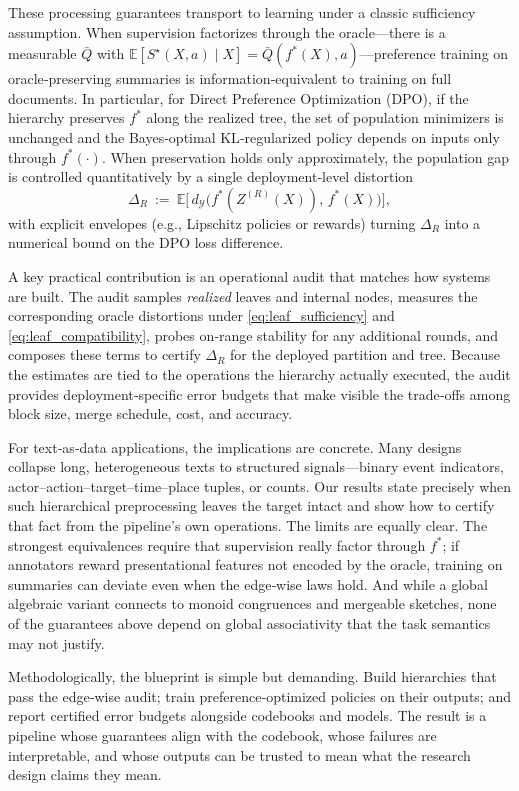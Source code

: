 \documentclass[11pt]{article}
\newcommand{\Y}{\mathcal{Y}}               %
\newcommand{\fstar}{f^*}               %
\newcommand{\E}{\mathbb{E}}
\newcommand{\metric}{d_{\Y}}
\begin{document}
These processing guarantees transport to learning under a classic sufficiency assumption. When supervision factorizes through the oracle—there is a measurable $\bar Q$ with $\E[S^\star(X,a)\mid X]=\bar Q(\fstar(X),a)$—preference training on oracle‑preserving summaries is information‑equivalent to training on full documents. In particular, for Direct Preference Optimization (DPO), if the hierarchy preserves $\fstar$ along the realized tree, the set of population minimizers is unchanged and the Bayes‑optimal KL‑regularized policy depends on inputs only through $\fstar(\cdot)$. When preservation holds only approximately, the population gap is controlled quantitatively by a single deployment‑level distortion
\[
\Delta_R\ :=\ \E\Big[\,\metric\!\big(\fstar(Z^{(R)}(X)),\,\fstar(X)\big)\Big],
\]
with explicit envelopes (e.g., Lipschitz policies or rewards) turning $\Delta_R$ into a numerical bound on the DPO loss difference.

A key practical contribution is an operational audit that matches how systems are built. The audit samples \emph{realized} leaves and internal nodes, measures the corresponding oracle distortions under \ref{eq:leaf_sufficiency} and \ref{eq:leaf_compatibility}, probes on‑range stability for any additional rounds, and composes these terms to certify $\Delta_R$ for the deployed partition and tree. Because the estimates are tied to the operations the hierarchy actually executed, the audit provides deployment‑specific error budgets that make visible the trade‑offs among block size, merge schedule, cost, and accuracy.

For text‑as‑data applications, the implications are concrete. Many designs collapse long, heterogeneous texts to structured signals—binary event indicators, actor–action–target–time–place tuples, or counts. Our results state precisely when such hierarchical preprocessing leaves the target intact and show how to certify that fact from the pipeline's own operations. The limits are equally clear. The strongest equivalences require that supervision really factor through $\fstar$; if annotators reward presentational features not encoded by the oracle, training on summaries can deviate even when the edge‑wise laws hold. And while a global algebraic variant connects to monoid congruences and mergeable sketches, none of the guarantees above depend on global associativity that the task semantics may not justify.

Methodologically, the blueprint is simple but demanding. Build hierarchies that pass the edge‑wise audit; train preference‑optimized policies on their outputs; and report certified error budgets alongside codebooks and models. The result is a pipeline whose guarantees align with the codebook, whose failures are interpretable, and whose outputs can be trusted to mean what the research design claims they mean.
\end{document}
